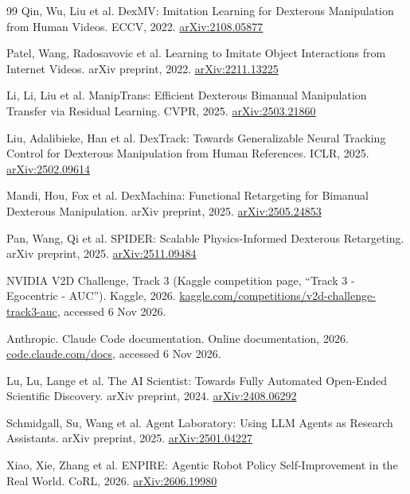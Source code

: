 \documentclass[11pt]{article}
\begin{document}
\begin{thebibliography}{99}
 Qin, Wu, Liu et al. DexMV: Imitation Learning for Dexterous Manipulation from Human Videos. ECCV, 2022. \href{https://arxiv.org/abs/2108.05877}{arXiv:2108.05877}

 Patel, Wang, Radosavovic et al. Learning to Imitate Object Interactions from Internet Videos. arXiv preprint, 2022. \href{https://arxiv.org/abs/2211.13225}{arXiv:2211.13225}

 Li, Li, Liu et al. ManipTrans: Efficient Dexterous Bimanual Manipulation Transfer via Residual Learning. CVPR, 2025. \href{https://arxiv.org/abs/2503.21860}{arXiv:2503.21860}

 Liu, Adalibieke, Han et al. DexTrack: Towards Generalizable Neural Tracking Control for Dexterous Manipulation from Human References. ICLR, 2025. \href{https://arxiv.org/abs/2502.09614}{arXiv:2502.09614}

 Mandi, Hou, Fox et al. DexMachina: Functional Retargeting for Bimanual Dexterous Manipulation. arXiv preprint, 2025. \href{https://arxiv.org/abs/2505.24853}{arXiv:2505.24853}

 Pan, Wang, Qi et al. SPIDER: Scalable Physics-Informed Dexterous Retargeting. arXiv preprint, 2025. \href{https://arxiv.org/abs/2511.09484}{arXiv:2511.09484}

 NVIDIA V2D Challenge, Track 3 (Kaggle competition page, ``Track 3 - Egocentric - AUC''). Kaggle, 2026. \href{https://www.kaggle.com/competitions/v2d-challenge-track3-auc}{kaggle.com/competitions/v2d-challenge-track3-auc}, accessed 6 Nov 2026.

 Anthropic. Claude Code documentation. Online documentation, 2026. \href{https://code.claude.com/docs}{code.claude.com/docs}, accessed 6 Nov 2026.

 Lu, Lu, Lange et al. The AI Scientist: Towards Fully Automated Open-Ended Scientific Discovery. arXiv preprint, 2024. \href{https://arxiv.org/abs/2408.06292}{arXiv:2408.06292}

 Schmidgall, Su, Wang et al. Agent Laboratory: Using LLM Agents as Research Assistants. arXiv preprint, 2025. \href{https://arxiv.org/abs/2501.04227}{arXiv:2501.04227}

 Xiao, Xie, Zhang et al. ENPIRE: Agentic Robot Policy Self-Improvement in the Real World. CoRL, 2026. \href{https://arxiv.org/abs/2606.19980}{arXiv:2606.19980}


\end{thebibliography}
\end{document}
